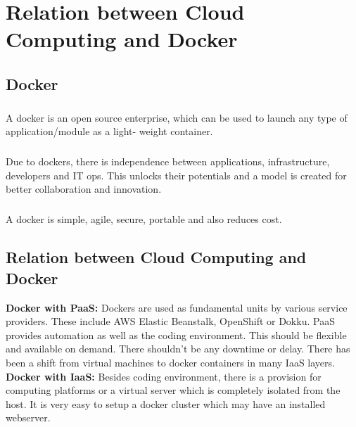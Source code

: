 \chapter{Relation between Cloud Computing and Docker}

\section{Docker}

\paragraph{\hspace{24pt}}
A docker is an open source enterprise, which can be used to launch any type of application/module as a light- weight container.

\paragraph{\hspace{24pt}}
Due to dockers, there is independence between applications, infrastructure, developers and IT ops. This unlocks their potentials and a model is created for better collaboration and innovation.

\paragraph{\hspace{24pt}}
A docker is simple, agile, secure, portable and also reduces cost.

\section{Relation between Cloud Computing and Docker}

\textbf{Docker with PaaS:} {Dockers are used as fundamental units by various service providers. These include AWS Elastic Beanstalk, OpenShift or Dokku. PaaS provides automation as well as the coding environment. This should be flexible and available on demand. There shouldn’t be any downtime or delay. There has been a shift from virtual machines to docker containers in many IaaS layers.}\\

\textbf{Docker with IaaS:} {Besides coding environment, there is a provision for computing platforms or a virtual server which is completely isolated from the host. It is very easy to setup a docker cluster which may have an installed webserver.}\\

